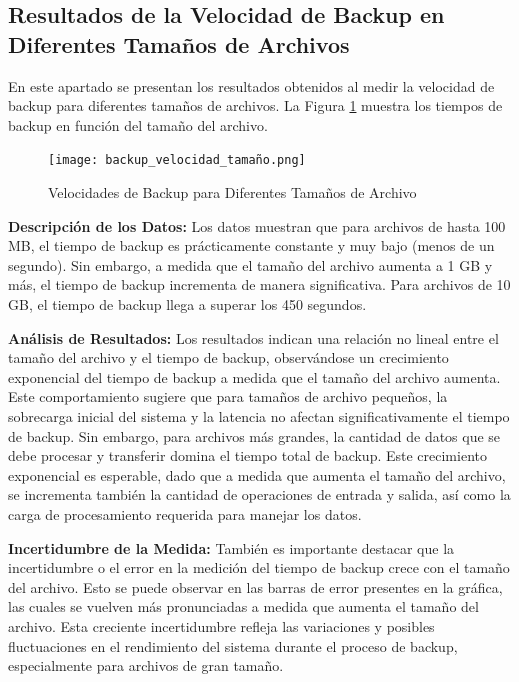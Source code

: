 

\subsection{Resultados de la Velocidad de Backup en Diferentes Tamaños de Archivos}

En este apartado se presentan los resultados obtenidos al medir la velocidad de backup para diferentes tamaños de archivos. La Figura \ref{fig:backup-velocidad-tamaño} muestra los tiempos de backup en función del tamaño del archivo.

\begin{figure}[H]
    \centering
    \texttt{[image: backup\_velocidad\_tamaño.png]}
    \caption{Velocidades de Backup para Diferentes Tamaños de Archivo}
    \label{fig:backup-velocidad-tamaño}
\end{figure}

\textbf{Descripción de los Datos:}
Los datos muestran que para archivos de hasta 100 MB, el tiempo de backup es prácticamente constante y muy bajo (menos de un segundo). Sin embargo, a medida que el tamaño del archivo aumenta a 1 GB y más, el tiempo de backup incrementa de manera significativa. Para archivos de 10 GB, el tiempo de backup llega a superar los 450 segundos.

\textbf{Análisis de Resultados:}
Los resultados indican una relación no lineal entre el tamaño del archivo y el tiempo de backup, observándose un crecimiento exponencial del tiempo de backup a medida que el tamaño del archivo aumenta. Este comportamiento sugiere que para tamaños de archivo pequeños, la sobrecarga inicial del sistema y la latencia no afectan significativamente el tiempo de backup. Sin embargo, para archivos más grandes, la cantidad de datos que se debe procesar y transferir domina el tiempo total de backup. Este crecimiento exponencial es esperable, dado que a medida que aumenta el tamaño del archivo, se incrementa también la cantidad de operaciones de entrada y salida, así como la carga de procesamiento requerida para manejar los datos.

\textbf{Incertidumbre de la Medida:}
También es importante destacar que la incertidumbre o el error en la medición del tiempo de backup crece con el tamaño del archivo. Esto se puede observar en las barras de error presentes en la gráfica, las cuales se vuelven más pronunciadas a medida que aumenta el tamaño del archivo. Esta creciente incertidumbre refleja las variaciones y posibles fluctuaciones en el rendimiento del sistema durante el proceso de backup, especialmente para archivos de gran tamaño.

